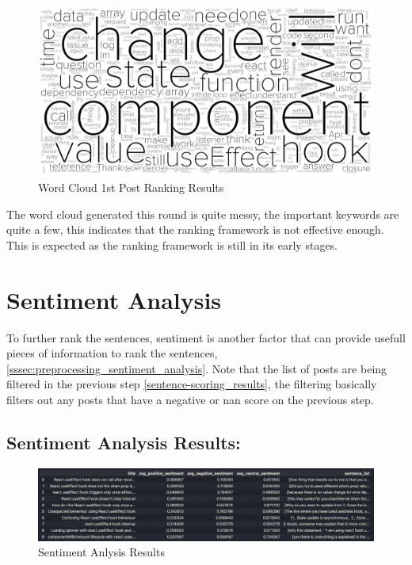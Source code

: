 \begin{figure}[H]
  \centering
  \includegraphics[scale=0.35]{rank_post_1.png}
  \caption{Word Cloud 1st Post Ranking  Results}
  \label{fig:rank_post_1_wc}
\end{figure}

\noindent The word cloud generated this round is quite messy, the important keywords are quite a few, this indicates that the ranking framework is not effective enough. This is expected as the ranking framework is still in its early stages.

\section{Sentiment Analysis} \label{sentiment-analysis_results}
To further rank the sentences, sentiment is another factor that can provide usefull pieces of information to rank the sentences, \ref{sssec:preprocessing_sentiment_analysis}. Note that the list of posts are being filtered in the previous step \ref{sentence-scoring_results}, the filtering basically filters out any posts that have a negative or nan score on the previous step.

\subsection{Sentiment Analysis Results:} \label{sentiment_analysis_results}
\begin{figure}[H]
  \centering
  \includegraphics[scale=0.60, angle=90]{assets/sentiment_analysis.png}
  \caption{Sentiment Anlysis Results}
  \label{fig:sentiment-analysis}
\end{figure}

